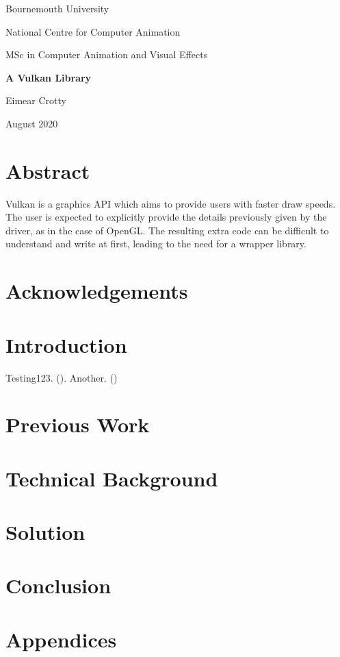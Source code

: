 \documentclass[12pt]{report}
\newcommand{\citebu}[1]{\citeauthor{#1} (\citeyear{#1})}
\theoremstyle{definition}
\begin{document}
  \renewcommand{\familydefault}{\sfdefault}
  \selectfont

  \begin{titlepage}
    \centering
    {\Huge Bournemouth University\par}
    \vspace{1cm}
    {\Large National Centre for Computer Animation\par}
    \vspace{1cm}
    {\Large MSc in Computer Animation and Visual Effects\par}
    \vspace{4cm}
    {\huge\bfseries A Vulkan Library\par}
    \vspace{1.5cm}
    {\Large Eimear Crotty\par}
    \vfill
    {\Large August 2020}
  \end{titlepage}

  \chapter*{Abstract}
    Vulkan is a graphics API which aims to provide users with faster draw speeds.
    The user is expected to explicitly provide the details previously given by
    the driver, as in the case of OpenGL. The resulting extra code can be
    difficult to understand and write at first, leading to the need for a 
    wrapper library.

  \chapter*{Acknowledgements}

    \vspace{1cm}

  \tableofcontents

  \chapter{Introduction}
    Testing123. \citebu{attiya1995sharing}. Another. \citebu{beyer2016site}

  \chapter{Previous Work}

  \chapter{Technical Background}

  \chapter{Solution}

  \chapter{Conclusion}

  
  

  \chapter*{Appendices}
  
\end{document}
